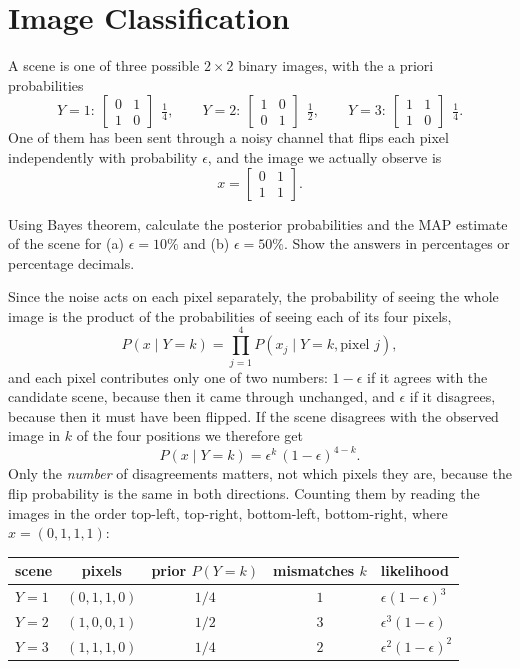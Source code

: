 \documentclass[11pt]{article}
\begin{document}
\section{Image Classification}

A scene is one of three possible $2\times2$ binary images, with the a priori
probabilities
\[
    Y = 1:\ \begin{bmatrix} 0 & 1 \\ 1 & 0 \end{bmatrix} \ \ \tfrac{1}{4},
    \qquad
    Y = 2:\ \begin{bmatrix} 1 & 0 \\ 0 & 1 \end{bmatrix} \ \ \tfrac{1}{2},
    \qquad
    Y = 3:\ \begin{bmatrix} 1 & 1 \\ 1 & 0 \end{bmatrix} \ \ \tfrac{1}{4}.
\]
One of them has been sent through a noisy channel that flips each pixel
independently with probability $\epsilon$, and the image we actually observe
is
\[
    x = \begin{bmatrix} 0 & 1 \\ 1 & 1 \end{bmatrix}.
\]

\begin{question}
Using Bayes theorem, calculate the posterior probabilities and the MAP
estimate of the scene for (a) $\epsilon = 10\%$ and (b) $\epsilon = 50\%$.
Show the answers in percentages or percentage decimals.
\end{question}

Since the noise acts on each pixel separately, the probability of seeing the
whole image is the product of the probabilities of seeing each of its four
pixels,
\[
    P(x \mid Y=k) = \prod_{j=1}^{4} P(x_j \mid Y=k, \text{pixel } j),
\]
and each pixel contributes only one of two numbers: $1-\epsilon$ if it agrees
with the candidate scene, because then it came through unchanged, and
$\epsilon$ if it disagrees, because then it must have been flipped. If the
scene disagrees with the observed image in $k$ of the four positions we
therefore get
\[
    P(x \mid Y=k) = \epsilon^{k}\,(1-\epsilon)^{4-k}.
\]
Only the \emph{number} of disagreements matters, not which pixels they are,
because the flip probability is the same in both directions. Counting them by
reading the images in the order top-left, top-right, bottom-left,
bottom-right, where $x = (0,1,1,1)$:

\begin{table}[H]
    \centering
    \begin{tabular}{lcccl}
        \toprule
        scene & pixels & prior $P(Y=k)$ & mismatches $k$ & likelihood \\
        \midrule
        $Y=1$ & $(0,1,1,0)$ & $1/4$ & $1$ & $\epsilon(1-\epsilon)^3$ \\
        $Y=2$ & $(1,0,0,1)$ & $1/2$ & $3$ & $\epsilon^3(1-\epsilon)$ \\
        $Y=3$ & $(1,1,1,0)$ & $1/4$ & $2$ & $\epsilon^2(1-\epsilon)^2$ \\
        \bottomrule
    \end{tabular}
\end{table}
\end{document}
